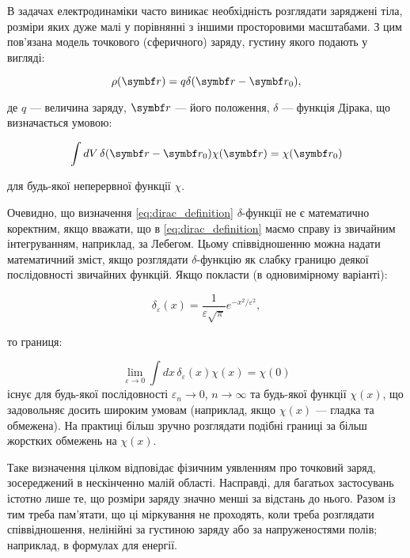 В задачах електродинаміки часто виникає необхідність розглядати заряджені тіла, розміри яких дуже малі у порівнянні з іншими просторовими масштабами. З
цим пов’язана модель точкового (сферичного) заряду, густину якого подають у вигляді:

\begin{equation}
\rho(\vect{r}) = q \delta(\vect{r} - \vect{r}_0),
\end{equation}

де \( q \) --- величина заряду, \( \vect{r} \) --- його положення, \( \delta \) --- функція Дірака, що визначається умовою:

\begin{equation}
\int dV \, \delta(\vect{r} - \vect{r}_0) \chi(\vect{r}) = \chi(\vect{r}_0)
\label{eq:dirac_definition}
\end{equation}

для будь-якої неперервної функції \( \chi \).

Очевидно, що визначення \eqref{eq:dirac_definition} \(\delta\)-функції не є математично коректним, якщо вважати, що в \eqref{eq:dirac_definition} маємо
справу із звичайним інтегруванням, наприклад, за Лебегом. Цьому співвідношенню можна надати математичний зміст, якщо розглядати \(\delta\)-функцію як
слабку границю деякої послідовності звичайних функцій. Якщо покласти (в одновимірному варіанті):

\begin{equation}
\delta_{\varepsilon}(x) = \frac{1}{\varepsilon \sqrt{\pi}} e^{-x^2 / \varepsilon^2},
\label{eq:delta_sequence}
\end{equation}

то границя:

\begin{equation}
\lim_{\varepsilon \to 0} \int dx \, \delta_{\varepsilon}(x) \chi(x) = \chi(0)
\label{eq:delta_limit}
\end{equation}
існує для будь-якої послідовності \( \varepsilon_n \to 0 \), \( n \to \infty \) та будь-якої функції \( \chi(x) \), що задовольняє досить широким умовам
(наприклад, якщо \( \chi(x) \) --- гладка та обмежена). На практиці більш зручно розглядати подібні границі за більш жорстких обмежень на \( \chi(x) \).

Таке визначення цілком відповідає фізичним уявленням про точковий заряд, зосереджений в нескінченно малій області. Насправді, для багатьох застосувань
істотно лише те, що розміри заряду значно менші за відстань до нього. Разом із тим треба пам’ятати, що ці міркування не проходять, коли треба розглядати
співвідношення, нелінійні за густиною заряду або за напруженостями полів; наприклад, в формулах для енергії.

